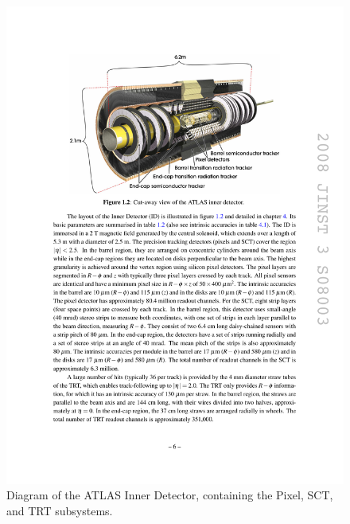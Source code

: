 \begin{centering}
\begin{figure}[bth]
\myfloatalign
\includegraphics[width=.90\linewidth]{figures/atlas/innerdetector.pdf}
\caption{Diagram of the \ac{ATLAS} Inner Detector, containing the Pixel, SCT, and TRT subsystems.}
\label{fig:ID}
\end{figure}
\end{centering}

